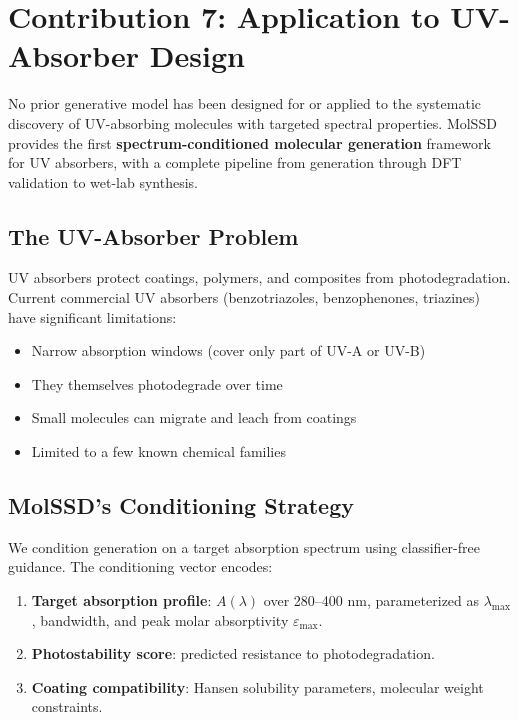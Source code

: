\documentclass[12pt,a4paper]{article}
\begin{document}
\section{Contribution 7: Application to UV-Absorber Design}

\begin{noveltybox}
No prior generative model has been designed for or applied to the systematic discovery of UV-absorbing molecules with targeted spectral properties. MolSSD provides the first \textbf{spectrum-conditioned molecular generation} framework for UV absorbers, with a complete pipeline from generation through DFT validation to wet-lab synthesis.
\end{noveltybox}

\subsection{The UV-Absorber Problem}

UV absorbers protect coatings, polymers, and composites from photodegradation. Current commercial UV absorbers (benzotriazoles, benzophenones, triazines) have significant limitations:
\begin{itemize}
  \item Narrow absorption windows (cover only part of UV-A or UV-B)
  \item They themselves photodegrade over time
  \item Small molecules can migrate and leach from coatings
  \item Limited to a few known chemical families
\end{itemize}

\subsection{MolSSD's Conditioning Strategy}

We condition generation on a target absorption spectrum using classifier-free guidance. The conditioning vector encodes:
\begin{enumerate}
  \item \textbf{Target absorption profile}: $A(\lambda)$ over 280--400 nm, parameterized as $\lambda_{\max}$, bandwidth, and peak molar absorptivity $\varepsilon_{\max}$.
  \item \textbf{Photostability score}: predicted resistance to photodegradation.
  \item \textbf{Coating compatibility}: Hansen solubility parameters, molecular weight constraints.
\end{enumerate}
\end{document}
